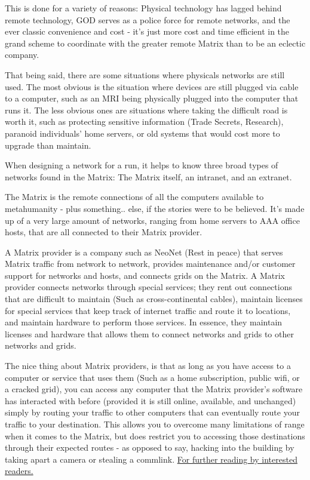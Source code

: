 \begin{multicols*}{3}
	This is done for a variety of reasons: Physical technology has lagged behind remote technology, GOD serves as a police force for remote networks, and the ever classic convenience and cost - it's just more cost and time efficient in the grand scheme to coordinate with the greater remote Matrix than to be an eclectic company.
	
	That being said, there are some situations where physicals networks are still used. The most obvious is the situation where devices are still plugged via cable to a computer, such as an MRI being physically plugged into the computer that runs it. The less obvious ones are situations where taking the difficult road is worth it, such as protecting sensitive information (Trade Secrets, Research), paranoid individuals' home servers, or old systems that would cost more to upgrade than maintain.
	
	When designing a network for a run, it helps to know three broad types of networks found in the Matrix: The Matrix itself, an intranet, and an extranet. 
	
	The Matrix is the remote connections of all the computers available to metahumanity - plus something.. else, if the stories were to be believed. It's made up of a very large amount of networks, ranging from home servers to AAA office hosts, that are all connected to their Matrix provider. 
	
	A Matrix provider is a company such as NeoNet (Rest in peace) that serves Matrix traffic from network to network, provides maintenance and/or customer support for networks and hosts, and connects grids on the Matrix. A Matrix provider connects networks through special services; they rent out connections that are difficult to maintain (Such as cross-continental cables), maintain licenses for special services that keep track of internet traffic and route it to locations, and maintain hardware to perform those services. In essence, they maintain licenses and hardware that allows them to connect networks and grids to other networks and grids.
	
	The nice thing about Matrix providers, is that as long as you have access to a computer or service that uses them (Such as a home subscription, public wifi, or a cracked grid), you can access any computer that the Matrix provider's software has interacted with before (provided it is still online, available, and unchanged) simply by routing your traffic to other computers that can eventually route your traffic to your destination. This allows you to overcome many limitations of range when it comes to the Matrix, but does restrict you to accessing those destinations through their expected routes - as opposed to say, hacking into the building by taking apart a camera or stealing a commlink. \textcolor{Blue}{\href{https://blog.thelifeofkenneth.com/2017/11/creating-autonomous-system-for-fun-and.html}{For further reading by interested readers.}}
	

\end{multicols*}
